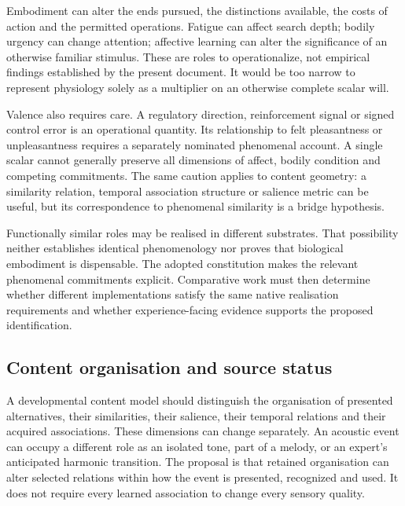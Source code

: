 \documentclass[
  11pt,
  a4paper,
]{article}
\begin{document}
Embodiment can alter the ends pursued, the distinctions available, the
costs of action and the permitted operations. Fatigue can affect search
depth; bodily urgency can change attention; affective learning can alter
the significance of an otherwise familiar stimulus. These are roles to
operationalize, not empirical findings established by the present
document. It would be too narrow to represent physiology solely as a
multiplier on an otherwise complete scalar will.

Valence also requires care. A regulatory direction, reinforcement signal
or signed control error is an operational quantity. Its relationship to
felt pleasantness or unpleasantness requires a separately nominated
phenomenal account. A single scalar cannot generally preserve all
dimensions of affect, bodily condition and competing commitments. The
same caution applies to content geometry: a similarity relation,
temporal association structure or salience metric can be useful, but its
correspondence to phenomenal similarity is a bridge hypothesis.

Functionally similar roles may be realised in different substrates. That
possibility neither establishes identical phenomenology nor proves that
biological embodiment is dispensable. The adopted constitution makes the
relevant phenomenal commitments explicit. Comparative work must then
determine whether different implementations satisfy the same native
realisation requirements and whether experience-facing evidence supports
the proposed identification.

\subsection{Content organisation and source
status}\label{content-organization-and-source-status}

A developmental content model should distinguish the organisation of
presented alternatives, their similarities, their salience, their
temporal relations and their acquired associations. These dimensions can
change separately. An acoustic event can occupy a different role as an
isolated tone, part of a melody, or an expert's anticipated harmonic
transition. The proposal is that retained organisation can alter
selected relations within how the event is presented, recognized and
used. It does not require every learned association to change every
sensory quality.
\end{document}
